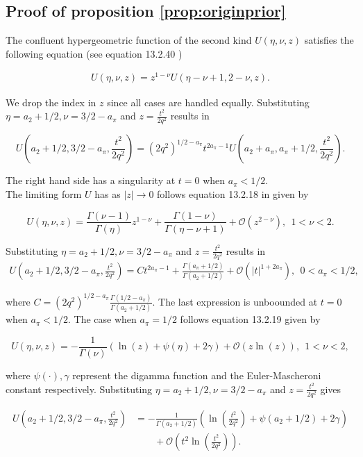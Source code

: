 \subsection*{Proof of proposition \ref{prop:originprior}}

The confluent hypergeometric function of the second kind $U(\eta, \nu, z)$ satisfies the following equation (see equation 13.2.40 \cite{nisthandbook})


\begin{align}
\label{eq:Utransformation}
   U(\eta,\nu, z)=z^{1-\nu} U(\eta-\nu+1, 2-\nu, z).
\end{align}

We drop the index in $z$ since all cases are handled equally. Substituting $\eta=a_2+1/2, \nu= 3/2-a_\pi$ and $z= \frac{t^2}{2q^2}$ results in

\[ U\left(a_2+1/2, 3/2-a_\pi, \frac{t^2}{2q^2} \right)= (2q^2)^{1/2-a_\pi} t^{2a_\pi-1} U\left(a_2+a_\pi, a_\pi+1/2,  \frac{t^2}{2q^2}\right).\]

The right hand side has a singularity at $t=0$ when $a_\pi<1/2$.  \\

The limiting form $U$ has as $|z|\to 0$ follows equation 13.2.18 in \cite{nisthandbook} given by

\[  U(\eta, \nu, z)= \frac{\Gamma(\nu-1)}{\Gamma(\eta)} z^{1-
\nu}+\frac{\Gamma(1-\nu)}{\Gamma(\eta-\nu+1)} +\mathcal{O}\left( z^{2-\nu}\right) , \ \ 1< \nu <2 .\]

Substituting $\eta=a_2+1/2, \nu= 3/2-a_\pi$ and $z= \frac{t^2}{2q^2}$ results in
\begin{align*}
U\left( a_2+1/2, 3/2-a_\pi, \frac{t^2}{2q^2}\right)= C t^{2a_\pi-1} + \frac{\Gamma(a_\pi+1/2)}{\Gamma(a_2+1/2)} +\mathcal{O}\left( |t|^{1+2a_\pi} \right) , \ \ 0< a_\pi <1/2 ,
\end{align*}

where $C= (2q^2)^{1/2-a_\pi} \frac{\Gamma(1/2-a_\pi)}{\Gamma(a_2+1/2)}$. The last expression is unboounded at $t=0$ when $a_\pi<1/2$. The case when $a_\pi=1/2$ follows equation 13.2.19 given by

\[  U(\eta, \nu, z)= -\frac{1}{\Gamma(\nu)}\left( \ln(z)+\psi(\eta)+2\gamma \right)  +\mathcal{O}\left(  z \ln (z)  \right) , \ \ 1< \nu <2 ,\]

where $\psi(\cdot), \gamma$ represent the digamma function and the Euler-Mascheroni constant respectively. Substituting $\eta=a_2+1/2, \nu=3/2-a_\pi$ and $z=\frac{t^2}{2q^2}$ gives

\begin{align*}
U\left( a_2+1/2, 3/2-a_\pi, \frac{t^2}{2q^2}\right)&= -\frac{1}{\Gamma(a_2+1/2)}\left( \ln\left( \frac{t^2}{2q^2} \right)+\psi(a_2+1/2)+2\gamma \right) \\&\qquad +\mathcal{O}\left(  t^2 \ln \left(\frac{t^2}{2q^2} \right) \right).
\end{align*}

